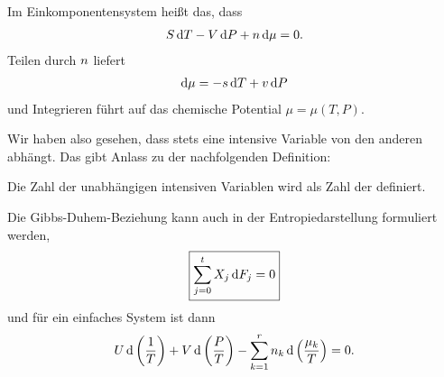 Im Einkomponentensystem heißt das, dass
\begin{align*}
    S\mathop{}\!\mathrm{d} T - V\mathop{}\!\mathrm{d} P + n \mathop{}\!\mathrm{d} \mu = 0.
\end{align*}
Teilen durch $n$ liefert
\begin{align*}
    \mathop{}\!\mathrm{d} \mu = -s \mathop{}\!\mathrm{d} T + v\mathop{}\!\mathrm{d} P
\end{align*}
und Integrieren führt auf das chemische Potential $\mu=\mu(T,P)$.

Wir haben also gesehen, dass stets eine intensive Variable von den anderen abhängt. Das gibt Anlass zu der nachfolgenden Definition:
\begin{formal}
    Die Zahl der unabhängigen intensiven Variablen wird als Zahl der  definiert.
\end{formal}

Die Gibbs-Duhem-Beziehung kann auch in der Entropiedarstellung formuliert werden,
\begin{align*}
    \boxed{\sum_{j=0}^t X_j \mathop{}\!\mathrm{d} F_j = 0}
\end{align*}
und für ein einfaches System ist dann
\begin{align*}
    U\mathop{}\!\mathrm{d}\left(\frac{1}{T}\right) + V\mathop{}\!\mathrm{d}\left(\frac{P}{T}\right)-\sum_{k=1}^r n_k\mathop{}\!\mathrm{d}\left(\frac{\mu_k}{T}\right)=0.
\end{align*}
